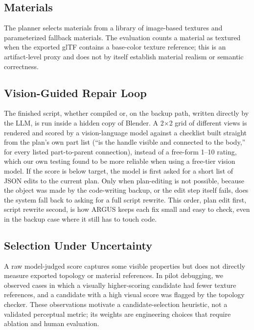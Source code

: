 \documentclass[conference]{IEEEtran}
\begin{document}
\subsection{Materials}
The planner selects materials from a library of image-based textures and parameterized fallback materials. The evaluation counts a material as textured when the exported glTF contains a base-color texture reference; this is an artifact-level proxy and does not by itself establish material realism or semantic correctness.

\subsection{Vision-Guided Repair Loop}
The finished script, whether compiled or, on the backup path, written directly by the LLM, is run inside a hidden copy of Blender. A 2$\times$2 grid of different views is rendered and scored by a vision-language model against a checklist built straight from the plan's own part list (``is the handle visible and connected to the body,'' for every listed part-to-parent connection), instead of a free-form 1--10 rating, which our own testing found to be more reliable when using a free-tier vision model. If the score is below target, the model is first asked for a short list of JSON edits to the current plan. Only when plan-editing is not possible, because the object was made by the code-writing backup, or the edit step itself fails, does the system fall back to asking for a full script rewrite. This order, plan edit first, script rewrite second, is how ARGUS keeps each fix small and easy to check, even in the backup case where it still has to touch code.

\subsection{Selection Under Uncertainty}
\label{sec:selection}
A raw model-judged score captures some visible properties but does not directly measure exported topology or material references. In pilot debugging, we observed cases in which a visually higher-scoring candidate had fewer texture references, and a candidate with a high visual score was flagged by the topology checker. These observations motivate a candidate-selection heuristic, not a validated perceptual metric; its weights are engineering choices that require ablation and human evaluation.
\end{document}
